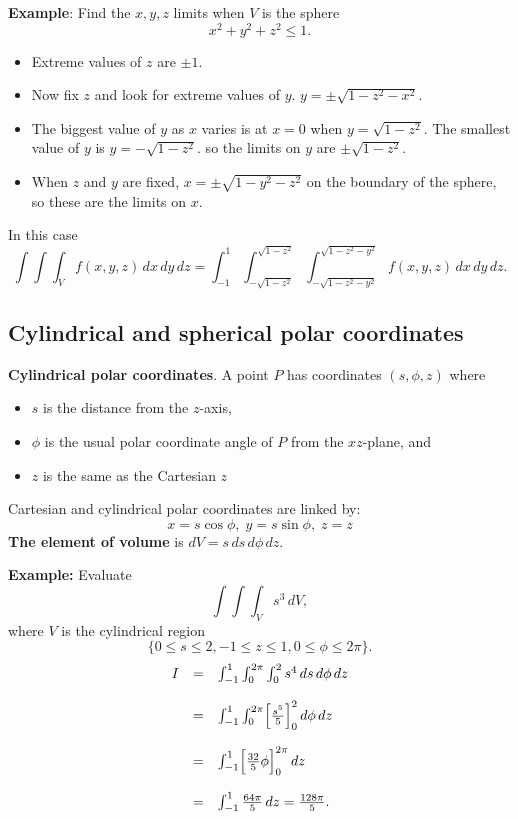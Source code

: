 \documentclass{article}
\begin{document}
\textbf{Example}: Find the $x, y, z$ limits when $V$ is the sphere
$$
x^2+y^2+z^2 \leq 1.
$$
\vspace{-.5cm}

\begin{itemize}
\item
Extreme values of $z$ are $\pm 1$. 
\item
Now fix $z$ and look for extreme values of $y$. $y= \pm \sqrt{1-z^2-x^2}$. 
\item
The biggest value of $y$ as $x$ varies is at $x=0$ when $y=\sqrt{1-z^2}$. The
smallest value of $y$ is $y=-\sqrt{1-z^2}$. so the limits on $y$
are $\pm \sqrt{1-z^2}$. 
\item
When $z$ and $y$ are fixed, $x=\pm
\sqrt{1-y^2-z^2}$ on the boundary of the sphere, so these are the
limits on $x$. 
\end{itemize}
In this case
{\small
$$
\int \int \int_V f(x,y,z) \, dx \, dy \, dz
= \int_{-1}^{1} \int_{-\sqrt{1-z^2}}^{\sqrt{1-z^2}}
\int_{-\sqrt{1-z^2-y^2}}^{\sqrt{1-z^2-y^2}} f(x,y,z) \, dx \, dy
\, dz.
$$
}


\subsection{Cylindrical and spherical polar coordinates}

\textbf{Cylindrical polar coordinates}. A point $P$ has coordinates $(s,\phi,z)$
where 
\begin{itemize}
\item
$s$ is the distance from the $z$-axis, 
\item
$\phi$ is the usual polar coordinate angle of $P$ from the $xz$-plane, and 
\item
$z$ is the same as the Cartesian $z$
\end{itemize}
Cartesian and cylindrical polar coordinates are linked by:
$$
x=s \cos \phi, \; y=s \sin \phi, \; z=z
$$
{\bf The element of volume} is $dV = s \, ds \, d\phi \, dz.$



\textbf{Example:} Evaluate
$$
 \int \int \int_V s^3 \, dV,
$$
 where $V$ is the cylindrical region 
 $$
 \lbrace 0 \leq s  \leq 2, -1 \leq z \leq 1, 0 \leq \phi \leq 2 \pi \rbrace.
 $$
$$
\begin{array}{lll}
I & = & \int_{-1}^{1} \int_0^{2 \pi} \int_0^2 s^4 \, ds\, d \phi \, dz \\
\\
 & = & \int_{-1}^{1} \int_0^{2 \pi} \Bigl[ \frac{s^5}{5} \Bigr]_0^2 \, d \phi \, dz\\
 \\
  & = & \int_{-1}^{1} \Bigl[ \frac{32}{5} \phi \Bigr]_0^{2 \pi} \, dz\\
  \\
   & = & \int_{-1}^{1} \frac{64\pi}{5} \, dz = \frac{128\pi}{5}.
\end{array}
$$
\end{document}

